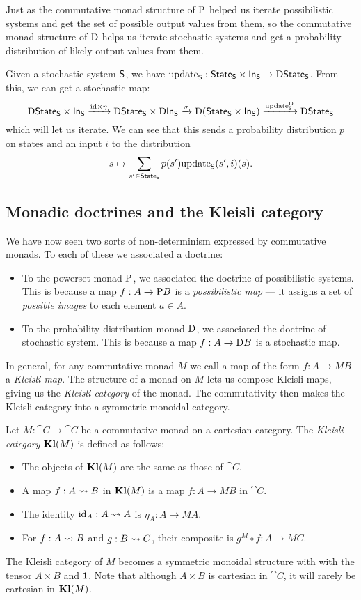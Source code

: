 \documentclass[DynamicalBook]{subfiles}
\begin{document}
Just as the commutative monad structure of $\mathrm{P}$ helped us iterate possibilistic systems
and get the set of possible output values from them, so the commutative monad
structure of $\mathrm{D}$ helps us iterate stochastic systems and get a
probability distribution of likely output values from them.

Given a stochastic system $\mathsf{S}$, we have $\mathrm{update}_{\mathsf{S}} : \mathsf{State}_{\mathsf{S}} \times
\mathsf{In}_{\mathsf{S}} \to \mathrm{D} \mathsf{State}_{\mathsf{S}}$. From this, we can get a stochastic map:
\[
\mathrm{D}\mathsf{State}_{\mathsf{S}} \times \mathsf{In}_{\mathsf{S}} \xrightarrow{\mathrm{id} \times \eta} \mathrm{D}\mathsf{State}_{\mathsf{S}} \times
\mathrm{D}\mathsf{In}_{\mathsf{S}} \xrightarrow{\sigma} \mathrm{D}(\mathsf{State}_{\mathsf{S}} \times \mathsf{In}_{\mathsf{S}})
\xrightarrow{\mathrm{update}_{\mathsf{S}}^{\mathrm{D}}} \mathrm{D}{\mathsf{State}_{\mathsf{S}}}
\]
which will let us iterate. We can see that this sends a probability distribution
$p$ on states and an input $i$ to the distribution
\[
s \mapsto \sum_{s' \in \mathsf{State}_{\mathsf{S}}} p(s') \mathrm{update}_{\mathsf{S}}(s', i)(s).
\]

\subsection{Monadic doctrines and the Kleisli category}
We have now seen two sorts of non-determinism expressed by commutative monads.
To each of these we associated a doctrine:
\begin{itemize}
  \item To the powerset monad $\mathrm{P}$, we associated the doctrine of
    possibilistic systems. This is because a map $f : A \to \mathrm{P} B$ is a
    \emph{possibilistic map} --- it assigns
    a set of \emph{possible images} to each element $a \in A$. 
  \item To the probability distribution monad $\mathrm{D}$, we associated the
    doctrine of stochastic system. This is because a map $f : A \to \mathrm{D} B$
    is a stochastic map.
\end{itemize}
In general, for any commutative monad $M$ we call a map of the form $f : A \to
MB$ a \emph{Kleisli map}. The structure of a monad on $M$ lets us compose
Kleisli maps, giving us the \emph{Kleisli category} of the monad. The
commutativity then makes the Kleisli category into a symmetric monoidal category.
\begin{definition}
  Let $M : \cat{C} \to \cat{C}$ be a commutative monad on a cartesian category. The \emph{Kleisli category} $\textbf{Kl}(M)$ is
  defined as follows:
  \begin{itemize}
    \item The objects of $\textbf{Kl}(M)$ are the same as those of $\cat{C}$.
    \item A map $f : A \rightsquigarrow B$ in $\textbf{Kl}(M)$ is a map $f : A \to MB$ in $\cat{C}$.
    \item The identity $\mathrm{id}_A : A \rightsquigarrow A$ is $\eta_A : A \to MA$.
    \item For $f : A \rightsquigarrow B$ and $g : B \rightsquigarrow C$, their composite is $g^M
      \circ f : A \to MC$.
  \end{itemize}
  The Kleisli category of $M$ becomes a symmetric monoidal structure with with
  the tensor $A \times B$ and $\mathsf{1}$. Note that although $A \times B$ is
  cartesian in $\cat{C}$, it will rarely be cartesian in $\textbf{Kl}(M)$.
\end{definition}
\end{document}
